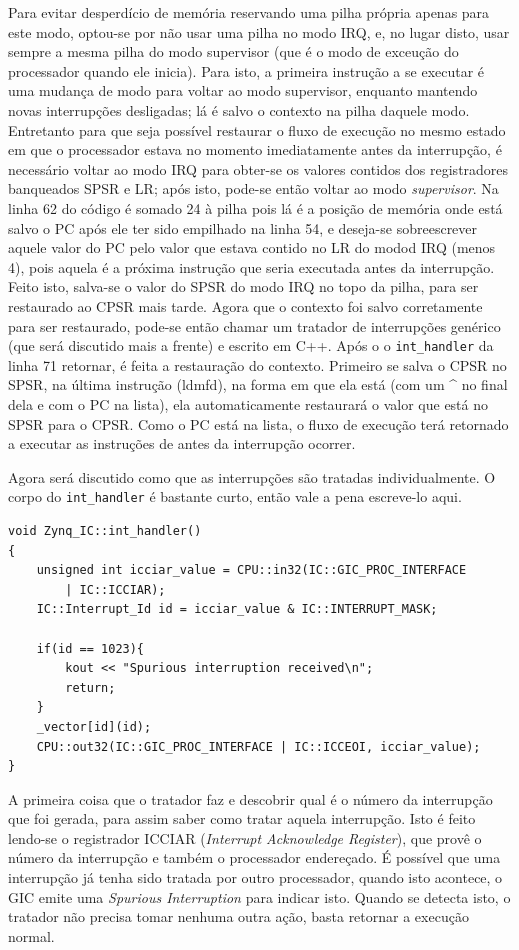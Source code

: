 \documentclass{ufscThesis/ufscThesis} %
\begin{document}
Para evitar desperdício de memória reservando uma pilha própria apenas para este modo, optou-se por não usar uma pilha no modo IRQ, e, no lugar disto, usar sempre a mesma pilha do modo supervisor (que é o modo de exceução do processador quando ele inicia). Para isto, a primeira instrução a se executar é uma mudança de modo para voltar ao modo supervisor, enquanto mantendo novas interrupções desligadas; lá é salvo o contexto na pilha daquele modo. Entretanto para que seja possível restaurar o fluxo de execução no mesmo estado em que o processador estava no momento imediatamente antes da interrupção, é necessário voltar ao modo IRQ para obter-se os valores contidos dos registradores banqueados SPSR e LR; após isto, pode-se então voltar ao modo \emph{supervisor}. Na linha 62 do código é somado 24 à pilha pois lá é a posição de memória onde está salvo o PC após ele ter sido empilhado na linha 54, e deseja-se sobreescrever aquele valor do PC pelo valor que estava contido no LR do modod IRQ (menos 4), pois aquela é a próxima instrução que seria executada antes da interrupção. Feito isto, salva-se o valor do SPSR do modo IRQ no topo da pilha, para ser restaurado ao CPSR mais tarde. Agora que o contexto foi salvo corretamente para ser restaurado, pode-se então chamar um tratador de interrupções genérico (que será discutido mais a frente) e escrito em C++. Após o o \verb+int_handler+ da linha 71 retornar, é feita a restauração do contexto. Primeiro se salva o CPSR no SPSR, na última instrução (ldmfd), na forma em que ela está (com um ^ no final dela e com o PC na lista), ela automaticamente restaurará o valor que está no SPSR para o CPSR. Como o PC está na lista, o fluxo de execução terá retornado a executar as instruções de antes da interrupção ocorrer.

Agora será discutido como que as interrupções são tratadas individualmente. O corpo do \verb+int_handler+ é bastante curto, então vale a pena escreve-lo aqui.

\begin{verbatim}
void Zynq_IC::int_handler()
{	
    unsigned int icciar_value = CPU::in32(IC::GIC_PROC_INTERFACE 
    	| IC::ICCIAR);
	IC::Interrupt_Id id = icciar_value & IC::INTERRUPT_MASK;

	if(id == 1023){
		kout << "Spurious interruption received\n";
		return;
	}
    _vector[id](id);
    CPU::out32(IC::GIC_PROC_INTERFACE | IC::ICCEOI, icciar_value);
}
\end{verbatim}

A primeira coisa que o tratador faz e descobrir qual é o número da interrupção que foi gerada, para assim saber como tratar aquela interrupção. Isto é feito lendo-se o registrador ICCIAR (\emph{Interrupt Acknowledge Register}), que provê o número da interrupção e também o processador endereçado.
É possível que uma interrupção já tenha sido tratada por outro processador, quando isto acontece, o GIC emite uma \emph{Spurious Interruption} para indicar isto. Quando se detecta isto, o tratador não precisa tomar nenhuma outra ação, basta retornar a execução normal.
\end{document}
